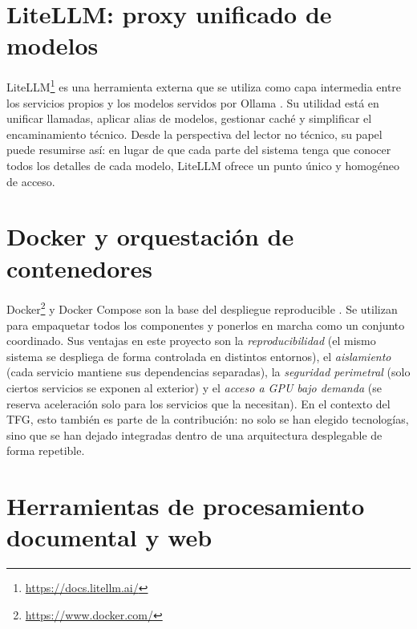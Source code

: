 \section{LiteLLM: proxy unificado de modelos}
\label{sec:litellm}

LiteLLM\footnote{\url{https://docs.litellm.ai/}} es una herramienta externa que se utiliza como capa intermedia entre los servicios propios y los modelos servidos por Ollama \cite{litellm2024docs}. Su utilidad está en unificar llamadas, aplicar alias de modelos, gestionar caché y simplificar el encaminamiento técnico. Desde la perspectiva del lector no técnico, su papel puede resumirse así: en lugar de que cada parte del sistema tenga que conocer todos los detalles de cada modelo, LiteLLM ofrece un punto único y homogéneo de acceso.

\section{Docker y orquestación de contenedores}
\label{sec:docker}

Docker\footnote{\url{https://www.docker.com/}} y Docker Compose son la base del despliegue reproducible \cite{dockerCompose2026docs}. Se utilizan para empaquetar todos los componentes y ponerlos en marcha como un conjunto coordinado. Sus ventajas en este proyecto son la \textit{reproducibilidad} (el mismo sistema se despliega de forma controlada en distintos entornos), el \textit{aislamiento} (cada servicio mantiene sus dependencias separadas), la \textit{seguridad perimetral} (solo ciertos servicios se exponen al exterior) y el \textit{acceso a GPU bajo demanda} (se reserva aceleración solo para los servicios que la necesitan). En el contexto del TFG, esto también es parte de la contribución: no solo se han elegido tecnologías, sino que se han dejado integradas dentro de una arquitectura desplegable de forma repetible.

\section{Herramientas de procesamiento documental y web}
\label{sec:herramientas-procesamiento}

